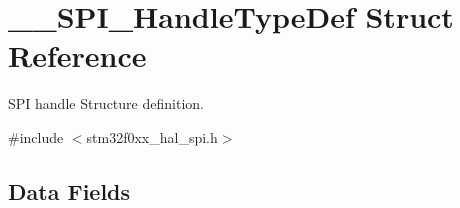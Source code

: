 \hypertarget{struct_____s_p_i___handle_type_def}{}\section{\+\_\+\+\_\+\+S\+P\+I\+\_\+\+Handle\+Type\+Def Struct Reference}
\label{struct_____s_p_i___handle_type_def}


S\+PI handle Structure definition.  




{\ttfamily \#include $<$stm32f0xx\+\_\+hal\+\_\+spi.\+h$>$}

\subsection*{Data Fields}

